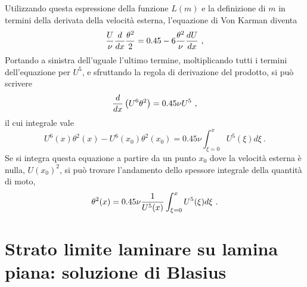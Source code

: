 Utilizzando questa espressione della funzione $L(m)$ e la definizione di $m$ in termini della derivata della velocità esterna, l'equazione di Von Karman diventa
\begin{equation}
 \f{U}{\nu} \f{d}{dx}\f{\theta^2}{2} = 0.45 - 6 \f{\theta^2}{\nu}\f{dU}{dx} \ ,
\end{equation}
Portando a sinistra dell'uguale l'ultimo termine, moltiplicando tutti i termini dell'equazione per $U^5$, e sfruttando la regola di derivazione del prodotto, si può scrivere
\begin{equation}
 \dfrac{d}{dx} \left( U^6 \theta^2 \right) = 0.45 \nu U^5 \ ,
\end{equation}
il cui integrale vale
\begin{equation}
 U^6(x)\theta^2(x) - U^6(x_0)\theta^2(x_0) = 0.45 \nu \int_{\xi=0}^{x} U^5(\xi) d\xi \ .
\end{equation}
Se si integra questa equazione a partire da un punto $x_0$ dove la velocità esterna è nulla, $U(x_0)^2$, si può trovare l'andamento dello spessore integrale della quantità di moto,
\begin{equation}
 \theta^2(x) = 0.45 \nu \dfrac{1}{U^5(x)} \int_{\xi=0}^{x} U^5(\xi) d\xi \ .
\end{equation}

\section{Strato limite laminare su lamina piana: soluzione di Blasius}
